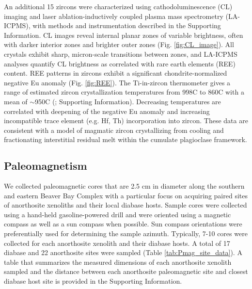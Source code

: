 An additional 15 zircons were characterized using cathodoluminescence (CL) imaging and laser ablation-inductively coupled plasma mass spectrometry (LA-ICPMS), with methods and instrumentation described in the Supporting Information. CL images reveal internal planar zones of variable brightness, often with darker interior zones and brighter outer zones (Fig. \ref{fig:CL_image}). All crystals exhibit sharp, micron-scale transitions between zones, and LA-ICPMS analyses quantify CL brightness as correlated with rare earth elements (REE) content. REE patterns in zircons exhibit a significant chondrite-normalized negative Eu anomaly (Fig. \ref{fig:REE}). The Ti-in-zircon thermometer gives a range of estimated zircon crystallization temperatures from 998\textdegree C to 860\textdegree C with a mean of $\sim$950\textdegree C (\citealp{Ferry2007a}; Supporting Information). Decreasing temperatures are correlated with deepening of the negative Eu anomaly and increasing incompatible trace element (e.g. Hf, Th) incorporation into zircon. These data are consistent with a model of magmatic zircon crystallizing from cooling and fractionating interstitial residual melt within the cumulate plagioclase framework.

\subsection{Paleomagnetism}

We collected paleomagnetic cores that are 2.5 cm in diameter along the southern and eastern Beaver Bay Complex with a particular focus on acquiring paired sites of anorthosite xenoliths and their local diabase hosts. Sample cores were collected using a hand-held gasoline-powered drill and were oriented using a magnetic compass as well as a sun compass when possible. Sun compass orientations were preferentially used for determining the sample azimuth. Typically, 7-10 cores were collected for each anorthosite xenolith and their diabase hosts. A total of 17 diabase and 22 anorthosite sites were sampled (Table \ref{tab:Pmag_site_data}). A table that summarizes the measured dimensions of each anorthosite xenolith sampled and the distance between each anorthosite paleomagnetic site and closest diabase host site is provided in the Supporting Information.  

